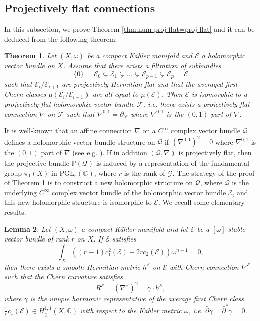 \documentclass[english,reqno]{amsart}
\newcommand\sE{{\mathscr E}}
\newcommand\sF{{\mathscr F}}
\newcommand\sG{{\mathscr G}}
\newcommand\sQ{{\mathscr Q}}
\newcommand\bp{{\bar\partial}}
\theoremstyle{plain}
\newtheorem{thm}{Theorem}[section]
\newtheorem{lemma}[thm]{Lemma}
\theoremstyle{definition}
\numberwithin{equation}{section} %
\begin{document}
\subsection{Projectively flat connections}

In this subsection,  we prove Theorem \ref{thm:num-proj-flat=proj-flat} and it can be deduced from the following theorem.

\begin{thm}\label{thm:Kahler:proj-flat-connection}
Let $(X,\omega)$ be a compact K\"ahler manifold and $\sE$  a holomorphic vector bundle on $X$. Assume that there exists a filtration of  subbundles
\[\{0\}=\sE_0\subsetneq \sE_1\subsetneq \dots\subsetneq \sE_{p-1}\subsetneq \sE_p=\sE\]
such that $\sE_i/\sE_{i+1}$ are  projectively Hermitian  flat and that the averaged first Chern classes $\mu(\sE_i/\sE_{i-1})$ are all equal to $\mu(\sE)$.
Then $\sE$ is isomorphic to a  projectively flat holomorphic vector bundle $\sF$, i.e.  there exists a projectively flat connection $\nabla$
    on $\sF$ such that  $\nabla^{0,1}=\bar\partial_{\sF}$ where
    $\nabla^{0,1}$ is the $(0,1)$-part of $\nabla$.
\end{thm}



\noindent  It is well-known that  an affine connection $\nabla$ on a $C^\infty$ complex vector bundle $\sQ$ defines a holomorphic vector bundle structure on $\sQ$ if $(\nabla^{0,1})^2=0$ where $\nabla^{0,1}$ is the $(0,1)$ part of $\nabla$ (see e.g. \cite[Proposition 1.3.7]{Kobayashi2014}).  If in addition  $(\sQ, \nabla)$ is projectively flat,  then the projective bundle $\mathbb{P}(\sQ)$ is induced by a representation of the fundamental group $\pi_1(X)$ in $\mathrm{PGL}_{r}(\mathbb{C})$, where $r$ is the rank of $\sG$. The strategy of the proof of Theorem \ref{thm:Kahler:proj-flat-connection} is to construct a new  holomorphic structure on $\sQ$, where $\sQ$ is the underlying $C^\infty$ complex vector bundle of the holomorphic vector bundle $\sE$, and this new holomorphic structure is isomorphic to $\sE$.   We recall some elementary results.



\begin{lemma} \label{lemma:unique-proj-flat-connection}
    Let $(X,\omega)$ a compact K\"ahler manifold and let $\sE$ be  a
    $[\omega]$-stable vector bundle of rank $r$ on $X$. If $\sE$ satisfies
    \begin{equation}\label{BG}
    \int_X \left((r-1) c_1^2(\sE)-2r c_2(\sE)\right)
    \omega^{n-1}=0,
    \end{equation}
    then there exists a smooth Hermitian
    metric $h^\sE$ on $\sE$ with Chern connection $\nabla^\sE$ such that the Chern curvature satisfies
    \begin{equation*}
    R^\sE= (\nabla^\sE)^2 = \gamma \cdot h^\sE,
    \end{equation*}
    where $\gamma$ is the unique harmonic representative of the average first Chern class
    $\frac{1}{r}c_1(\sE)\in H_{\bp}^{1,1}(X,\mathbb{C})$ with respect to the K\"ahler metric
    $\omega$, i.e. $\bp\gamma=\bp^*\gamma=0$.
\end{lemma}
\end{document}

